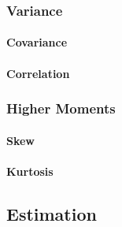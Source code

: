 \subsubsection{Variance}


\paragraph{Covariance}

\paragraph{Correlation}


\subsubsection{Higher Moments}

\paragraph{Skew}

\paragraph{Kurtosis}







\subsection{Estimation}






\begin{comment}

- Maybe rename file to Rand_Statistics.tex



\end{comment}